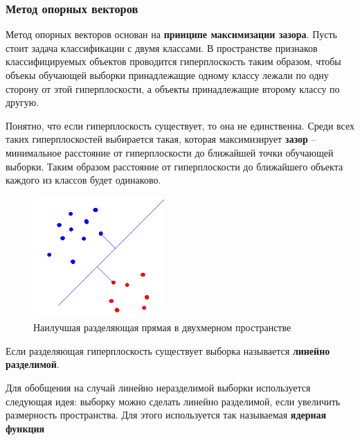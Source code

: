 
\subsubsection{Метод опорных векторов}
Метод опорных векторов основан на \textbf{принципе максимизации зазора}. Пусть стоит задача классификации с двумя классами. В пространстве признаков классифицируемых объектов проводится гиперплоскость таким образом, чтобы объекы обучающей выборки принадлежащие одному классу лежали по одну сторону от этой гиперплоскости, а объекты принадлежащие второму классу по другую.

Понятно, что если гиперплоскость существует, то она не единственна. Среди всех таких гиперплоскостей выбирается такая, которая максимизирует \textbf{зазор} -- минимальное расстояние от гиперплоскости до ближайшей точки обучающей выборки. Таким образом расстояние от гиперплоскости до ближайшего объекта каждого из классов будет одинаково.

\begin{figure}[h]
\begin{center}
\includegraphics[width=5cm]{img/svm}
\end{center}
\caption{Наилучшая разделяющая прямая в двухмерном пространстве}
\label{svm}
\end{figure}

Если разделяющая гиперплоскость существует выборка называется \textbf{линейно разделимой}.

Для обобщения на случай линейно неразделимой выборки используется следующая идея: выборку можно сделать линейно разделимой, если увеличить размерность пространства. Для этого используется так называемая \textbf{ядерная функция}

